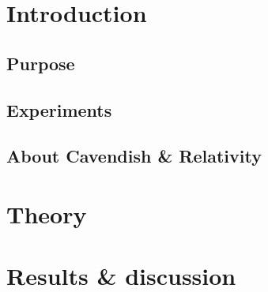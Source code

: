 \documentclass[11pt]{article} %
\title{\titlee}
\author{Losito Stefano}
\date{\today}
\newcommand{\titlee}{Cavendish \& Relativity}%
\begin{document}
	
	\bigskip
		\posttitle{\end{center}}
	
	\maketitle
	
	\newpage
\tableofcontents

\listoffigures

\pagebreak

\section{Introduction}

\subsection{Purpose}

\subsection{Experiments}

\subsection{About \titlee}

\section{Theory}


\section{Results \& discussion}
\end{document}
